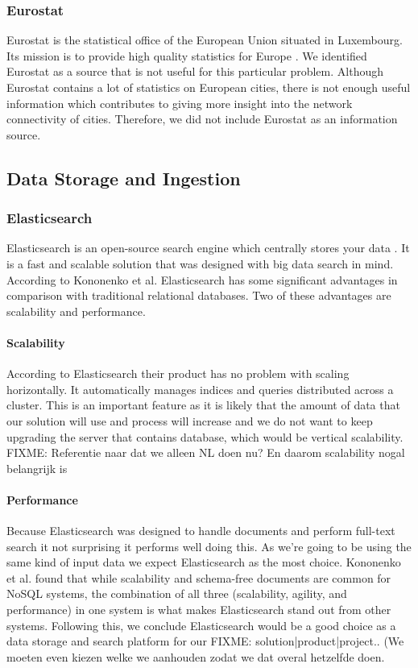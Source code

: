 \subsubsection{Eurostat}
Eurostat is the statistical office of the European Union situated in Luxembourg. Its mission is to provide high quality statistics for Europe \cite{Eurostat}. We identified Eurostat as a source that is not useful for this particular problem. Although Eurostat contains a lot of statistics on European cities, there is not enough useful information which contributes to giving more insight into the network connectivity of cities. Therefore, we did not include Eurostat as an information source.

\subsection{Data Storage and Ingestion}
\subsubsection{Elasticsearch}
Elasticsearch is an open-source search engine which centrally stores your data \cite{Elasticsearch}. It is a fast and scalable solution that was designed with big data search in mind. According to Kononenko et al. \cite{Kononenko2014} Elasticsearch has some significant advantages in comparison with traditional relational databases. Two of these advantages are scalability and performance. 

\paragraph{Scalability} According to Elasticsearch \cite{Elasticsearch} their product has no problem with scaling horizontally. It automatically manages indices and queries distributed across a cluster. This is an important feature as it is likely that the amount of data that our solution will use and process will increase and we do not want to keep upgrading the server that contains database, which would be vertical scalability. {\color{Red} FIXME: Referentie naar dat we alleen NL doen nu? En daarom scalability nogal belangrijk is}

\paragraph{Performance}
Because Elasticsearch was designed to handle documents and perform full-text search it not surprising it performs well doing this. As we're going to be using the same kind of input data we expect Elasticsearch as the most choice. Kononenko et al. found that while scalability and schema-free documents are common for NoSQL systems, the combination of all three (scalability, agility, and performance) in one system is what makes Elasticsearch stand out from other systems. Following this, we conclude Elasticsearch would be a good choice as a data storage and search platform for our {\color{Red} FIXME: solution|product|project.. (We moeten even kiezen welke we aanhouden zodat we dat overal hetzelfde doen}.\\

